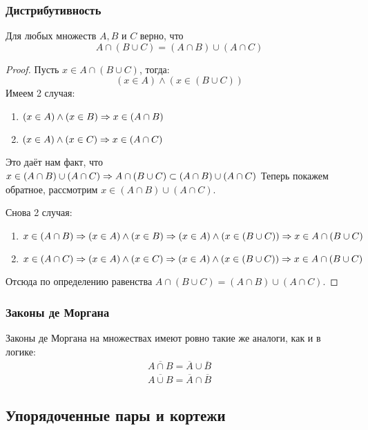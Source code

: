 \subsubsection*{Дистрибутивность}

\begin{proposition}
	Для любых множеств $A, B$ и $C$ верно, что
	$$
		A \cap (B \cup C) = (A \cap B) \cup (A \cap C)
	$$
\end{proposition}

\begin{proof}
	Пусть $x \in A \cap (B \cup C)$, тогда:
	$$
	(x \in A) \wedge (x \in (B \cup C))
	$$
	Имеем 2 случая:
	\begin{enumerate}
		\item $(x \in A) \wedge (x \in B) \Rightarrow x \in (A \cap B)$
		\item $(x \in A) \wedge (x \in C) \Rightarrow x \in (A \cap C)$
	\end{enumerate}
	Это даёт нам факт, что $x \in (A \cap B) \cup (A \cap C) \Rightarrow A \cap (B \cup C) \subset (A \cap B) \cup (A \cap C)$
	Теперь покажем обратное, рассмотрим $x \in (A \cap B) \cup (A \cap C)$.
	
	Снова 2 случая:
	\begin{enumerate}
		\item $x \in (A \cap B) \Rightarrow (x \in A) \wedge (x \in B) \Rightarrow (x \in A) \wedge (x \in (B \cup C)) \Rightarrow x \in A \cap (B \cup C)$
		\item $x \in (A \cap C) \Rightarrow (x \in A) \wedge (x \in C) \Rightarrow (x \in A) \wedge (x \in (B \cup C)) \Rightarrow x \in A \cap (B \cup C)$
	\end{enumerate}

	Отсюда по определению равенства $A \cap (B \cup C) = (A \cap B) \cup (A \cap C)$.
\end{proof}

\subsubsection*{Законы де Моргана}

Законы де Моргана на множествах имеют ровно такие же аналоги, как и в логике:
\begin{align*}
	\overline{A \cap B} = \overline{A} \cup \overline{B}
	\\
	\overline{A \cup B} = \overline{A} \cap \overline{B}
\end{align*}

\subsection{Упорядоченные пары и кортежи}

